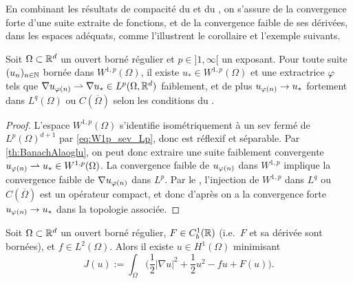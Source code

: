En combinant les résultats de compacité du  et du , on s'assure de la convergence forte d'une suite extraite de fonctions, et de la convergence faible de ses dérivées, dans les espaces adéquats, comme l'illustrent le corollaire et l'exemple suivants.

\begin{corollary}
\label{corol:Rellich}
%
	Soit $\Omega \subset \mathbb{R}^d$ un ouvert borné régulier et $p \in ]1,\infty[$ un exposant.
	Pour toute suite $(u_n)_{n \in \mathbb{N}}$ bornée dans $W^{1,p}(\Omega)$, il existe $u_* \in W^{1,p}(\Omega)$ et une extractrice $\varphi$ tels que $\nabla u_{\varphi(n)} \rightharpoonup \nabla u_* \in L^p(\Omega,\mathbb{R}^d)$ faiblement, et de plus $u_{\varphi(n)} \to u_*$ fortement dans $L^q(\Omega)$ ou $C(\overline \Omega)$ selon les conditions du . 
\end{corollary}

\begin{proof} 	
	L'espace $W^{1,p}(\Omega)$ s'identifie isométriquement à un sev fermé de $L^p(\Omega)^{d+1}$ par \eqref{eq:W1p_sev_Lp}, donc est réflexif et séparable. Par \cref{th:BanachAlaoglu}, on peut donc extraire une suite faiblement convergente $u_{\varphi(n)} \rightharpoonup u_* \in W^{1,p}(\Omega)$. La convergence faible de $u_{\varphi(n)}$ dans $W^{1,p}$ implique la convergence faible de $\nabla u_{\varphi(n)}$ dans $L^p$. 
	Par le , l'injection de $W^{1,p}$ dans $L^q$ ou $C(\overline \Omega)$ est un opérateur compact, et donc d'après  on a la convergence forte $u_{\varphi(n)} \to u_*$ dans la topologie associée.	
\end{proof}



\begin{exemple}
\label{ex:nonLinMinH1}
%
	Soit $\Omega\subset \mathbb{R}^d$ un ouvert borné régulier, $F\in C^1_b(\mathbb{R})$ (i.e.\ $F$ et sa dérivée sont bornées), et $f \in L^2(\Omega)$. Alors il existe $u\in H^1(\Omega)$ minimisant 
	\begin{equation*}
		J(u) := \int_\Omega \Big(\frac 1 2 |\nabla u|^2 + \frac 1 2 u^2 - f u + F(u) \Big).
	\end{equation*}
\end{exemple}

